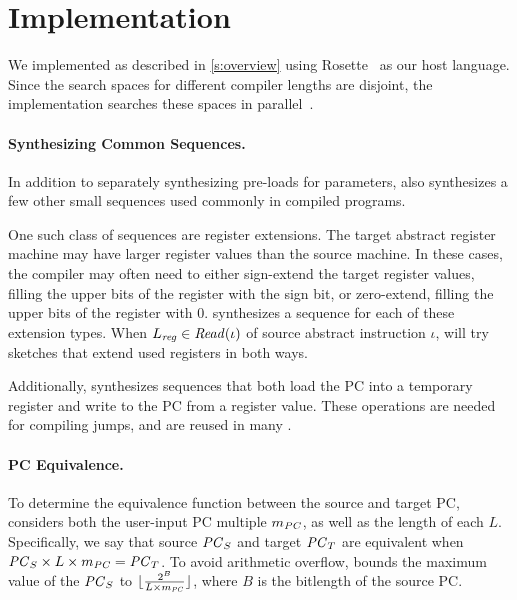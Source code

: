 \section{Implementation}\label{s:impl}
We implemented \jitsynth as described in \autoref{s:overview} using
Rosette~\cite{torlak:rosette} as our host language.
Since the search spaces for different compiler lengths are disjoint,
the \jitsynth implementation searches these spaces in parallel~\cite{bornholt:synapse}.
%
\paragraph{Synthesizing Common Sequences.}
In addition to separately synthesizing pre-loads for parameters,
\jitsynth also synthesizes a few other small sequences used commonly in compiled programs.

One such class of sequences are register extensions.
The target abstract register machine may have larger register values than the source machine.
In these cases, the compiler may often need to either sign-extend the target register values,
filling the upper bits of the register with the sign bit,
or zero-extend, filling the upper bits of the register with 0.
\jitsynth synthesizes a sequence for each of these extension types.
When $L_\mathit{reg}\in\mathit{Read}(\iota)$ of source abstract instruction $\iota$,
\jitsynth will try sketches that extend used registers in both ways.

Additionally, \jitsynth synthesizes sequences
that both load the PC into a temporary register
and write to the PC from a register value.
These operations are needed for compiling jumps,
and are reused in many \minicompilers.

\paragraph{PC Equivalence.}
To determine the equivalence function between the source and target PC,
\jitsynth considers both the user-input PC multiple $m_{\mathit{PC}}$,
as well as the length of each \minicompiler $L$.
Specifically, we say that source $\mathit{PC}_S$ and target $\mathit{PC}_T$
are equivalent when $\mathit{PC}_S \times L \times m_{\mathit{PC}} = \mathit{PC}_T$.
To avoid arithmetic overflow,
\jitsynth bounds the maximum value of the $\mathit{PC}_S$ to
$\lfloor\frac{2^B}{L \times m_{\mathit{PC}}}\rfloor$,
where $B$ is the bitlength of the source PC.

